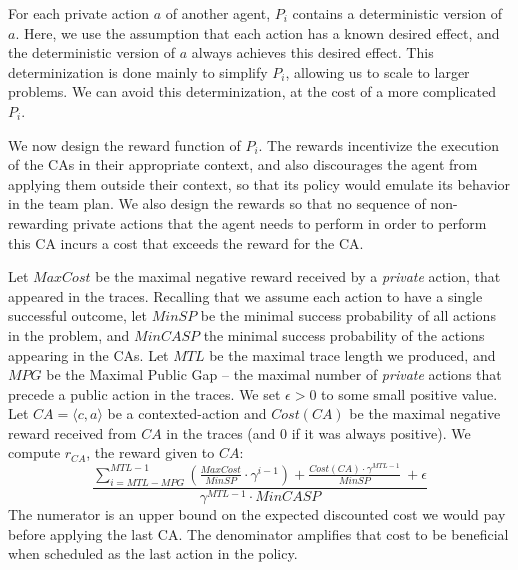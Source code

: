 \documentclass[letterpaper]{article} %
\theoremstyle{definition}
\newcommand{\eliran}[1]{\textbf{[\color{red}ELIRAN:#1]}}
\newcommand{\ronen}[1]{\textbf{[\color{blue}RONEN:#1]}}
\begin{document}
For each private action $a$ of another agent, $P_i$ contains a deterministic version of $a$. Here, we use the assumption that each action has a known desired effect, and the deterministic version of $a$ always achieves this desired effect. This determinization is done mainly to simplify $P_i$, allowing us to scale to larger problems. We can avoid this determinization, at the cost of a more complicated $P_i$.

We now design the reward function of $P_i$. The rewards incentivize the execution of the CAs in their appropriate context, and also discourages the agent from applying them outside their context, so that its policy would emulate its behavior in the team plan. 
We also design the rewards so that no sequence of non-rewarding private actions that the agent needs to perform in order to perform this CA incurs a cost that exceeds the reward for the CA.



Let $MaxCost$ be the maximal negative reward received by a \emph{private} action, that appeared in the traces.
Recalling that we assume each action to have a single successful outcome, let $MinSP$ be the minimal success probability of all actions in the problem, and $MinCASP$ the minimal success probability of the actions appearing in the CAs. Let $MTL$ be the maximal trace length we produced, and $MPG$ be the Maximal Public Gap -- the maximal number of \emph{private} actions that precede a public action in the traces. We set $\epsilon > 0$ to some small positive value.
Let $CA=\langle c, a \rangle$ be a contexted-action and $Cost(CA)$ be the maximal negative reward received from $CA$ in the traces (and 0 if it was always positive). We compute $r_{CA}$, the reward given to $CA$:
\begin{equation*}
\label{eqn:rq}
   \frac{\sum_{i=MTL - MPG}^{MTL-1}(\frac{MaxCost}{MinSP} \cdot \gamma^{i-1})+ \frac{Cost(CA) \cdot \gamma^{MTL-1}}{MinSP} \ +\epsilon}{\gamma^{MTL-1}\cdot MinCASP} 
\end{equation*}%
The numerator is an upper bound on the expected discounted cost we would pay before applying the last CA. The denominator amplifies that cost to be beneficial when scheduled as the last action in the policy.
\end{document}
